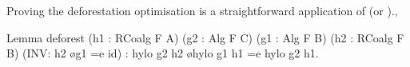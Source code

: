 \documentclass[a4paper,anonymous, UKenglish,cleveref, autoref, thm-restate]{lipics-v2021}
\begin{document}

Proving the deforestation optimisation is a straightforward application
of  (or ).,
\begin{coqcode}
Lemma deforest (h1 : RCoalg F A) (g2 : Alg F C)
  (g1 : Alg F B) (h2 : RCoalg F B) (INV: h2 \o g1 =e id)
  : hylo g2 h2 \o hylo g1 h1 =e hylo g2 h1.
\end{coqcode}
\end{document}

